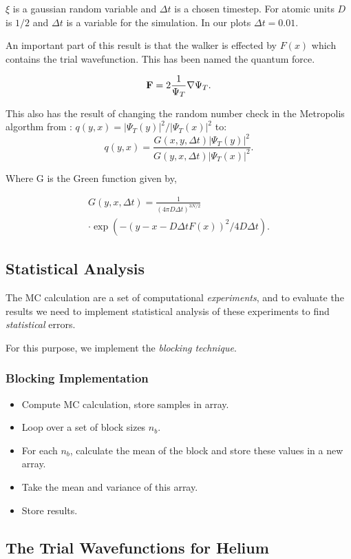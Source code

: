 \documentclass[twocolumn]{article}[10pt]
\newcommand{\eq}[1]{\begin{align*}#1\end{align*}}
\renewcommand\vec[1]{{\bf #1}}
\begin{document}
$\xi $ is a gaussian random variable and $\Delta t$ is a chosen timestep.
For atomic units $D$ is $1/2$ and $\Delta t$ is a variable for the 
simulation. In our plots $\Delta t = 0.01$. 

An important part of this result is that the walker is effected by $F(x)$
which contains the trial wavefunction. This has been named the quantum 
force. 

\begin{align*}
\vec F = 2\frac{1}{\Psi_T}\nabla \Psi_T. 
\end{align*}

This also has the result of changing the random number check in the 
Metropolis algorthm from :
$q(y,x) = |\Psi_T(y)|^2/|\Psi_T(x)|^2$ to: 
\[
q(y,x) = \frac{G(x,y,\Delta t)|\Psi_T(y)|^2}{G(y,x,\Delta t)|\Psi_T(x)|^2}.
\]

Where G is the Green function given by,

\eq{
  G(y,x,\Delta t) =  \frac{1}{(4\pi D\Delta t)^{3N/2}}\\ \cdot \exp{\left(-(y-x-D\Delta t F(x))^2/4D\Delta t\right)}.
}

\subsection{Statistical Analysis}
The MC calculation are a set of computational \textit{experiments}, 
and to evaluate the results 
we need to implement statistical analysis of these experiments
to find \textit{statistical} errors.

For this purpose, we implement the \textit{blocking technique}.


\subsubsection{Blocking Implementation}

\begin{itemize}
    \item Compute MC calculation, store samples in array.
    \item Loop over a set of block sizes $n_b$.
    \item For each $n_b$, calculate the mean of the block
        and store these values in a new array.
    \item Take the mean and variance of this array.
    \item Store results.
\end{itemize}

\subsection{The Trial Wavefunctions for Helium}
\end{document}
